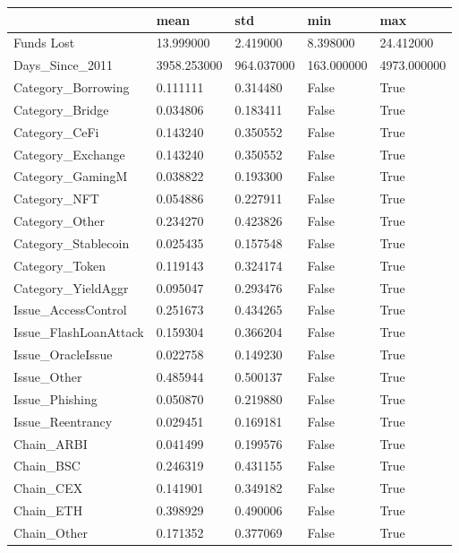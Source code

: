 \begin{tabular}{lllll}
\toprule
 & mean & std & min & max \\
\midrule
Funds Lost & 13.999000 & 2.419000 & 8.398000 & 24.412000 \\
Days\_Since\_2011 & 3958.253000 & 964.037000 & 163.000000 & 4973.000000 \\
Category\_Borrowing & 0.111111 & 0.314480 & False & True \\
Category\_Bridge & 0.034806 & 0.183411 & False & True \\
Category\_CeFi & 0.143240 & 0.350552 & False & True \\
Category\_Exchange & 0.143240 & 0.350552 & False & True \\
Category\_GamingM & 0.038822 & 0.193300 & False & True \\
Category\_NFT & 0.054886 & 0.227911 & False & True \\
Category\_Other & 0.234270 & 0.423826 & False & True \\
Category\_Stablecoin & 0.025435 & 0.157548 & False & True \\
Category\_Token & 0.119143 & 0.324174 & False & True \\
Category\_YieldAggr & 0.095047 & 0.293476 & False & True \\
Issue\_AccessControl & 0.251673 & 0.434265 & False & True \\
Issue\_FlashLoanAttack & 0.159304 & 0.366204 & False & True \\
Issue\_OracleIssue & 0.022758 & 0.149230 & False & True \\
Issue\_Other & 0.485944 & 0.500137 & False & True \\
Issue\_Phishing & 0.050870 & 0.219880 & False & True \\
Issue\_Reentrancy & 0.029451 & 0.169181 & False & True \\
Chain\_ARBI & 0.041499 & 0.199576 & False & True \\
Chain\_BSC & 0.246319 & 0.431155 & False & True \\
Chain\_CEX & 0.141901 & 0.349182 & False & True \\
Chain\_ETH & 0.398929 & 0.490006 & False & True \\
Chain\_Other & 0.171352 & 0.377069 & False & True \\
\bottomrule
\end{tabular}
